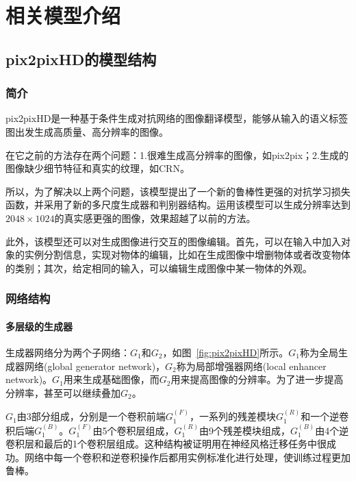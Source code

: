 
\chapter{相关模型介绍}

\section{pix2pixHD的模型结构}

\subsection{简介}

pix2pixHD是一种基于条件生成对抗网络的图像翻译模型，能够从输入的语义标签图出发生成高质量、高分辨率的图像。

在它之前的方法存在两个问题：1.很难生成高分辨率的图像，如pix2pix\cite{pix2pix}；2.生成的图像缺少细节特征和真实的纹理，如CRN\cite{crn}。
  
所以，为了解决以上两个问题，该模型提出了一个新的鲁棒性更强的对抗学习损失函数，并采用了新的多尺度生成器和判别器结构。运用该模型可以生成分辨率达到$2048×1024$的真实感更强的图像，效果超越了以前的方法。

此外，该模型还可以对生成图像进行交互的图像编辑。首先，可以在输入中加入对象的实例分割信息，实现对物体的编辑，比如在生成图像中增删物体或者改变物体的类别；其次，给定相同的输入，可以编辑生成图像中某一物体的外观。

\subsection{网络结构}

\subsubsection{多层级的生成器}

生成器网络分为两个子网络：$G_1$和$G_2$，如图~\ref{fig:pix2pixHD}所示。$G_1$称为全局生成器网络(global generator network)，$G_2$称为局部增强器网络(local enhancer network)。$G_1$用来生成基础图像，而$G_2$用来提高图像的分辨率。为了进一步提高分辨率，甚至可以继续叠加$G_2$。

$G_1$由3部分组成，分别是一个卷积前端$G_1^{(F)}$，一系列的残差模块$G_1^{(R)}$和一个逆卷积后端$G_1^{(B)}$。$G_1^{(F)}$由5个卷积层组成，$G_1^{(R)}$由9个残差模块组成，$G_1^{(B)}$由4个逆卷积层和最后的1个卷积层组成。这种结构被证明用在神经风格迁移任务中很成功。网络中每一个卷积和逆卷积操作后都用实例标准化进行处理，使训练过程更加鲁棒。


